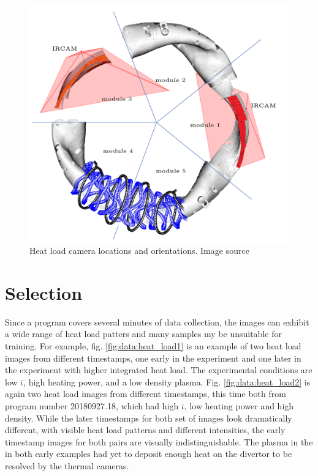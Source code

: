 \begin{figure}[htb]
	\includegraphics[width=\textwidth]{images/cameras.png}
	\caption{Heat load camera locations and orientations. Image source \cite{Blatzheim_2019}}
	\label{fig:data:cameras}
\end{figure}

\label{sec:Data Selection}
\section{Selection}

Since a program covers several minutes of data collection, the images can exhibit a wide range of heat load patters and many samples my be unsuitable for training. For example, fig. \ref{fig:data:heat_load1} is an example of two heat load images from different timestamps, one early in the experiment and one later in the experiment with higher integrated heat load. The experimental conditions are low $\bar{\iota}$, high heating power, and a low density plasma. Fig. \ref{fig:data:heat_load2} is again two heat load images from different timestamps, this time both from program number 20180927.18, which had high $\bar{\iota}$, low heating power and high density. While the later timestamps for both set of images look dramatically different, with visible heat load patterns and different intensities, the early timestamp images for both pairs are visually indistinguishable. The plasma in the in both early examples had yet to deposit enough heat on the divertor to be resolved by the thermal cameras.

